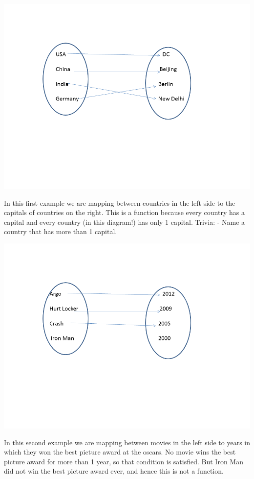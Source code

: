 \documentclass[12pt]{article}
\begin{document}
\includegraphics[scale=0.5]{func1.png}

In this first example we are mapping between countries in the left side to the capitals of countries on the right. This is a function because every country has a capital and every country (in this diagram!) has only 1 capital. Trivia: - Name a country that has more than 1 capital.

\includegraphics[scale=0.5]{func2.png}

In this second example we are mapping between movies in the left side to years in which they won the best picture award at the oscars. No movie wins the best picture award for more than 1 year, so that condition is satisfied. But Iron Man did not win the best picture award ever, and hence this is not a function.
\end{document}

